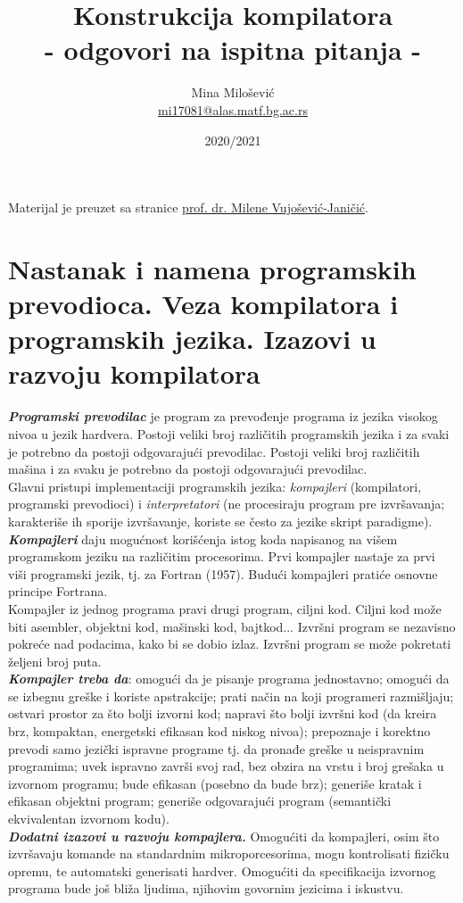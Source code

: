 \documentclass[10pt]{extarticle}
\title{Konstrukcija kompilatora \\ - odgovori na ispitna pitanja -}
\author{Mina Milošević \\
\href{mailto:mi17081@alas.matf.bg.ac.rs}{mi17081@alas.matf.bg.ac.rs}}
\date{2020/2021}
\begin{document}
\maketitle

\vspace{10cm}
Materijal je preuzet sa stranice \href{http://www.prevodioci.matf.bg.ac.rs/KonstrukcijaKompilatora.html#2_tab}{prof. dr. Milene Vujošević-Janičić}.

\newpage

\renewcommand*\contentsname{Sadržaj}
\tableofcontents
\newpage

\section{Nastanak i namena programskih prevodioca. Veza kompilatora i programskih jezika. Izazovi u razvoju kompilatora}
\noindent
\textit{\textbf{Programski prevodilac}} je program za prevođenje programa iz jezika visokog nivoa u jezik hardvera. Postoji veliki broj različitih programskih jezika i za svaki je potrebno da postoji odgovarajući prevodilac. 
Postoji veliki broj različitih mašina i za svaku je potrebno da postoji odgovarajući prevodilac. \\
Glavni pristupi implementaciji programskih jezika: \textit{kompajleri} (kompilatori, programski prevodioci) i \textit{interpretatori} (ne procesiraju program pre izvršavanja; karakteriše ih sporije izvršavanje, koriste se često za jezike skript paradigme). \\
\textit{\textbf{Kompajleri}} daju mogućnost korišćenja istog koda napisanog na višem programskom jeziku na različitim procesorima. Prvi kompajler nastaje za prvi viši programski jezik, tj. za Fortran (1957). Budući kompajleri pratiće osnovne principe Fortrana. \\
Kompajler iz jednog programa pravi drugi program, ciljni kod. Ciljni kod može biti asembler, objektni kod, mašinski kod, bajtkod... Izvršni program se nezavisno pokreće nad podacima, kako bi se dobio izlaz. Izvršni program se može pokretati željeni broj puta. \\
\textit{\textbf{Kompajler treba da}}: omogući da je pisanje
programa jednostavno; omogući da se izbegnu greške i koriste apstrakcije; prati način na koji programeri razmišljaju; ostvari prostor za što bolji izvorni kod; napravi što bolji izvršni kod (da kreira brz, kompaktan, energetski efikasan kod niskog nivoa); prepoznaje i korektno prevodi samo jezički ispravne programe tj. da pronađe greške u neispravnim programima; uvek ispravno završi svoj rad, bez obzira na vrstu i broj grešaka u izvornom programu; bude efikasan (posebno da bude brz); generiše kratak i efikasan objektni program; generiše odgovarajući program (semantički ekvivalentan izvornom kodu). \\
\textit{\textbf{Dodatni izazovi u razvoju kompajlera.}} Omogućiti da kompajleri, osim što izvršavaju komande na standardnim mikroporcesorima,
mogu kontrolisati fizičku opremu, te automatski generisati hardver. Omogućiti da specifikacija izvornog programa bude još bliža
ljudima, njihovim govornim jezicima i iskustvu.
 
\end{document}
